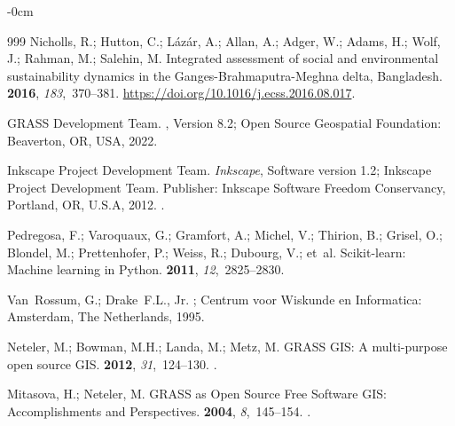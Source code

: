 \documentclass[water,article,accept,pdftex,oneauhor]{Definitions/mdpi}
\begin{document}
{{{\begin{adjustwidth}{-\extralength}{0cm}
\begin{thebibliography}{999}
Nicholls, R.; Hutton, C.; Lázár, A.; Allan, A.; Adger, W.; Adams, H.; Wolf,
  J.; Rahman, M.; Salehin, M.
\newblock Integrated assessment of social and environmental sustainability
  dynamics in the Ganges-Brahmaputra-Meghna delta, Bangladesh.
 {\bf 2016}, {\em 183},~370--381. %
\newblock 
  {\url{https://doi.org/10.1016/j.ecss.2016.08.017}}.

{GRASS Development Team}.
, Version 8.2;
\newblock Open Source Geospatial Foundation: Beaverton, OR, USA, %
 2022.

{Inkscape Project Development Team}.
\newblock \emph{Inkscape},
\newblock Software version 1.2; Inkscape Project Development Team. Publisher: Inkscape Software Freedom Conservancy, Portland, OR, U.S.A, 2012. %
.

Pedregosa, F.; Varoquaux, G.; Gramfort, A.; Michel, V.; Thirion, B.; Grisel,
  O.; Blondel, M.; Prettenhofer, P.; Weiss, R.; Dubourg, V.;  et~al.
\newblock Scikit-learn: Machine learning in Python.
 {\bf 2011}, {\em 12},~2825--2830.

Van~Rossum, G.; Drake~F.L., Jr.
; Centrum voor Wiskunde en Informatica:
  Amsterdam, The Netherlands,
 1995.

Neteler, M.; Bowman, M.H.; Landa, M.; Metz, M.
\newblock GRASS GIS: A multi-purpose open source GIS.
 {\bf 2012}, {\em 31},~124--130.
.

Mitasova, H.; Neteler, M.
\newblock GRASS as Open Source Free Software GIS: Accomplishments and
  Perspectives.
 {\bf 2004}, {\em 8},~145--154.
.


\end{thebibliography}
\end{adjustwidth}}}}
\end{document}
